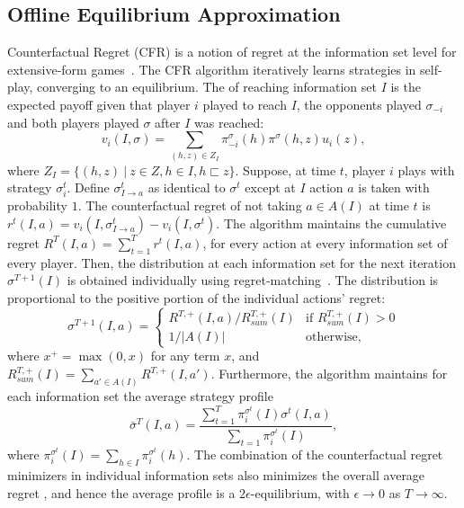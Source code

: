 \documentclass{aamas2015}
\newcommand{\defword}[1]{\textbf{\boldmath{#1}}}
\begin{document}
\subsection{Offline Equilibrium Approximation}

Counterfactual Regret (CFR) is a notion of regret at the information set level for extensive-form games~\cite{CFR}. 
The CFR algorithm iteratively learns strategies in self-play, converging to an equilibrium. 
The \defword{counterfactual value} of reaching information set $I$ is the expected payoff given that player $i$ played to reach $I$, the opponents played 
$\sigma_{-i}$ and both players played $\sigma$ after $I$ was reached:
\begin{equation}
\label{eq:cfv}
v_i(I,\sigma) = \sum_{(h,z) \in Z_I} \pi^{\sigma}_{-i}(h) \pi^{\sigma}(h,z) u_i(z), 
\end{equation}
where $Z_I = \{ (h,z)~|~z \in Z, h \in I, h \sqsubset z \}$.
Suppose, at time $t$, player $i$ plays with strategy $\sigma^t_i$. 
Define $\sigma^t_{I \rightarrow a}$ as identical to $\sigma^t$ except at $I$ action $a$ is taken with probability $1$. 
The counterfactual regret of not taking $a \in A(I)$ at time $t$ is $r^t(I,a) = v_i(I,\sigma^t_{I \rightarrow a}) - v_i(I,\sigma^t)$. 
The algorithm maintains the cumulative regret $R^T(I,a) = \sum_{t=1}^T r^t(I,a)$, for every action at every information set of every player. 
Then, the distribution at each information set for the next iteration $\sigma^{T+1}(I)$ is obtained individually using 
regret-matching~\cite{Hart00}. The distribution is proportional to the positive portion of the individual actions' regret:
\begin{equation*}
\label{eq:rm}
\sigma^{T+1}(I,a) = \left\{
\begin{array}{ll}
R^{T,+}(I,a) / R^{T,+}_{sum}(I) & \mbox{if } R^{T,+}_{sum}(I) > 0 \\ 
1 / |A(I)|                   & \mbox{otherwise,}
\end{array} \right.
\end{equation*}
where $x^+ = \max(0,x)$ for any term $x$, and $R^{T,+}_{sum}(I) = \sum_{a' \in A(I)} R^{T,+}(I,a')$. Furthermore, the algorithm maintains for each information set the average strategy profile
\begin{equation}
\bar{\sigma}^T(I,a) = \frac{\sum_{t=1}^T \pi^{\sigma^t}_i(I) \sigma^t(I,a)}{\sum_{t=1} \pi^{\sigma^t}_i(I)}, 
\end{equation}
where $\pi^{\sigma^t}_i(I) = \sum_{h \in I}\pi^{\sigma^t}_i(h)$.
The combination of the counterfactual regret minimizers in individual information sets also minimizes the overall average regret \cite{CFR}, and hence the average profile is a $2\epsilon$-equilibrium, with $\epsilon \rightarrow 0$
as $T \rightarrow \infty$.
\end{document}
